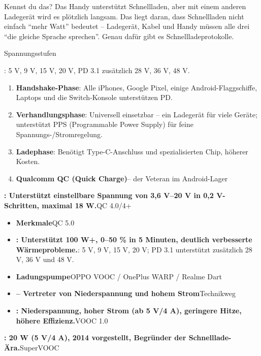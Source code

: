 
Kennst du das? Das Handy unterstützt Schnellladen, aber mit einem anderen Ladegerät wird es plötzlich langsam. Das liegt daran, dass Schnellladen nicht einfach “mehr Watt” bedeutet – Ladegerät, Kabel und Handy müssen alle drei “die gleiche Sprache sprechen”. Genau dafür gibt es Schnellladeprotokolle.


Spannungsstufen

: 5 V, 9 V, 15 V, 20 V, PD 3.1 zusätzlich 28 V, 36 V, 48 V.

\begin{enumerate}
  \item \textbf{Handshake-Phase}: Alle iPhones, Google Pixel, einige Android-Flaggschiffe, Laptops und die Switch-Konsole unterstützen PD.
  \item \textbf{Verhandlungsphase}: Universell einsetzbar – ein Ladegerät für viele Geräte; unterstützt PPS (Programmable Power Supply) für feine Spannungs-/Stromregelung.
  \item \textbf{Ladephase}: Benötigt Type-C-Anschluss und spezialisierten Chip, höherer Kosten.
  \item \textbf{Qualcomm QC (Quick Charge)}– der Veteran im Android-Lager
\end{enumerate}


\textbf{: Unterstützt einstellbare Spannung von 3,6 V–20 V in 0,2 V-Schritten, maximal 18 W.}QC 4.0/4+

\begin{itemize}
  \item \textbf{Merkmale}QC 5.0
  \item \textbf{: Unterstützt 100 W+, 0–50 \% in 5 Minuten, deutlich verbesserte Wärmeprobleme.}: 5 V, 9 V, 15 V, 20 V; PD 3.1 unterstützt zusätzlich 28 V, 36 V und 48 V.
  \item \textbf{Ladungspumpe}OPPO VOOC / OnePlus WARP / Realme Dart
  \item \textbf{– Vertreter von Niederspannung und hohem Strom}Technikweg
  \item \textbf{: Niederspannung, hoher Strom (ab 5 V/4 A), geringere Hitze, höhere Effizienz.}VOOC 1.0
\end{itemize}

\textbf{: 20 W (5 V/4 A), 2014 vorgestellt, Begründer der Schnelllade-Ära.}SuperVOOC

